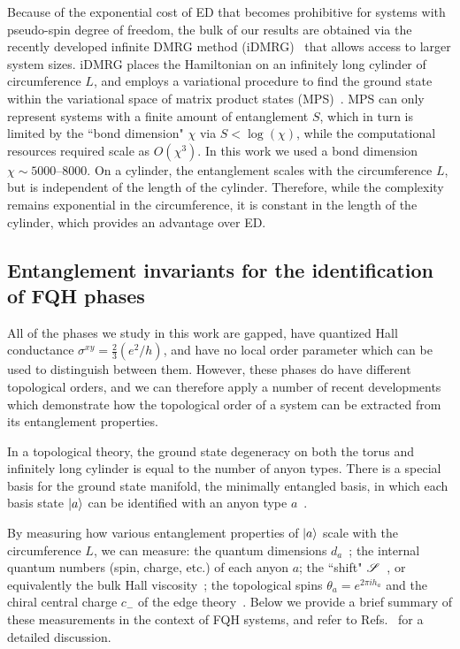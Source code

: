 Because of the exponential cost of ED that becomes prohibitive for systems with pseudo-spin degree of freedom, the bulk of our results are obtained via the recently developed infinite DMRG method (iDMRG)~\cite{ZaletelQHdmrg13, ZaletelMixing} that allows access to larger system sizes. 
iDMRG places the Hamiltonian on an infinitely long cylinder of circumference $L$, and employs a variational procedure to find the ground state within the variational space of matrix product states (MPS)~\cite{Fannes1992,Ostlund1995,Rommer1997}. 
MPS can only represent systems with a finite amount of entanglement $S$, which in turn is limited by the ``bond dimension" $\chi$ via $S < \log(\chi)$, while the computational resources required scale as $O(\chi^3)$. In this work we used a bond dimension $\chi \sim 5000\mbox{--}8000$.
On a cylinder, the entanglement scales with the circumference $L$, but is independent of the length of the cylinder. 
Therefore, while the complexity remains exponential in the circumference, it is constant in the length of the cylinder, which provides an advantage over ED. 


\subsection{Entanglement invariants for the identification of FQH phases}
\label{sec:ent_sig}

All of the phases we study in this work are gapped,  have quantized Hall conductance $\sigma^{xy} = \frac23 (e^2/h)$, and  have no local order parameter which can be used to distinguish between them.
However, these phases do have different topological orders, and we can therefore apply a number of recent developments~\cite{Zhang2012,Cincio2013,ZaletelQHdmrg13,HHTuMomPol13} which demonstrate how the topological order of a system can be extracted from its entanglement properties.

In a topological theory, the ground state degeneracy on both the torus and infinitely long cylinder is equal to the number of anyon types.
There is a special basis for the ground state manifold, the minimally entangled basis, in which each basis state $\ket{a}$ can be identified with an anyon type $a$~\cite{KitaevPreskill, LiHaldane, Zhang2012}.

By measuring how various entanglement properties of $\ket{a}$ scale with the circumference $L$, we can measure:
	the quantum dimensions $d_a$~\cite{KitaevPreskill,LevinWen};
	the internal quantum numbers (spin, charge, etc.) of each anyon $a$;
	the ``shift" $\mathscr{S}$~\cite{wenzee}, or equivalently the bulk Hall viscosity~\cite{ZaletelQHdmrg13};
	the topological spins $\theta_a = e^{2 \pi i h_a}$ and the chiral central charge $c_-$ of the edge theory~\cite{Zhang2012, ZaletelQHdmrg13, HHTuMomPol13}.
Below we provide a brief summary of these measurements in the context of FQH systems, and refer to Refs.~\cite{ZaletelMixing} for a detailed discussion. 

